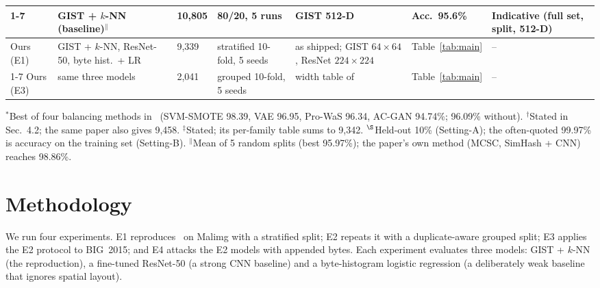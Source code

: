 \documentclass[conference]{IEEEtran}
\begin{document}
\begin{table}[t]
\begin{tabular}{@{}p{1.6cm}p{3.0cm}p{1.1cm}p{2.3cm}p{3.0cm}p{2.6cm}p{2.8cm}@{}}
\cmidrule{1-7}
\cite{ni2018simhash} & GIST + $k$-NN (baseline)$^\|$ & 10,805 & 80/20, 5 runs & GIST 512-D & Acc.\ 95.6\% & Indicative (full set, split, 512-D) \\
\midrule
Ours (E1) & GIST + $k$-NN, ResNet-50, byte hist.\ + LR & 9,339 & stratified 10-fold, 5 seeds & as shipped; GIST $64\times64$, ResNet $224\times224$ & Table~\ref{tab:main} & -- \\
\cmidrule{1-7}
Ours (E3) & same three models & 2,041 & grouped 10-fold, 5 seeds & width table of~\cite{nataraj2011images} & Table~\ref{tab:main} & -- \\
\bottomrule
\end{tabular}
\par\smallskip
{\footnotesize $^*$Best of four balancing methods in~\cite{tariq2026framework} (SVM-SMOTE 98.39, VAE 96.95, Pro-WaS 96.34, AC-GAN 94.74\%; 96.09\% without).
$^\dagger$Stated in Sec.~4.2; the same paper also gives 9,458.
$^\ddagger$Stated; its per-family table sums to 9,342.
$^\S$Held-out 10\% (Setting-A); the often-quoted 99.97\% is accuracy on the training set (Setting-B).
$^\|$Mean of 5 random splits (best 95.97\%); the paper's own method (MCSC, SimHash + CNN) reaches 98.86\%.\par}
\end{table}



\section{Methodology}
We run four experiments. E1 reproduces~\cite{nataraj2011images} on Malimg with a
stratified split; E2 repeats it with a duplicate-aware grouped split; E3 applies the
E2 protocol to BIG~2015; and E4 attacks the E2 models with appended bytes. Each
experiment evaluates three models: GIST + $k$-NN (the reproduction), a fine-tuned
ResNet-50 (a strong CNN baseline) and a byte-histogram logistic regression (a
deliberately weak baseline that ignores spatial layout).
\end{document}
